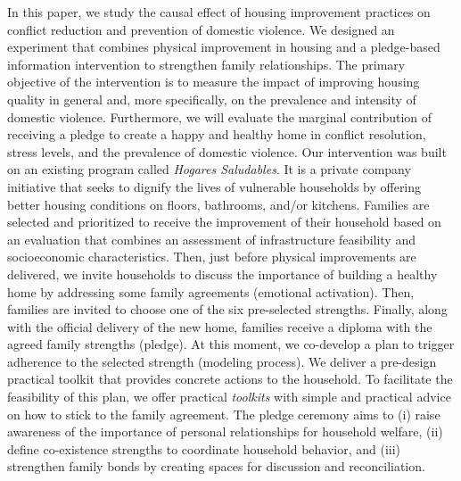         In this paper, we study the causal effect of housing improvement practices on conflict reduction and prevention of domestic violence. We designed an experiment that combines physical improvement in housing and a pledge-based information intervention to strengthen family relationships. The primary objective of the intervention is to measure the impact of improving housing quality in general and, more specifically, on the prevalence and intensity of domestic violence. Furthermore, we will evaluate the marginal contribution of receiving a pledge to create a happy and healthy home in conflict resolution, stress levels, and the prevalence of domestic violence. Our intervention was built on an existing program called \emph{Hogares Saludables}. It is a private company initiative that seeks to dignify the lives of vulnerable households by offering better housing conditions on floors, bathrooms, and/or kitchens. Families are selected and prioritized to receive the improvement of their household based on an evaluation that combines an assessment of infrastructure feasibility and socioeconomic characteristics. Then, just before physical improvements are delivered, we invite households to discuss the importance of building a healthy home by addressing some family agreements (emotional activation). Then, families are invited to choose one of the six pre-selected strengths. Finally, along with the official delivery of the new home, families receive a diploma with the agreed family strengths (pledge). At this moment, we co-develop a plan to trigger adherence to the selected strength (modeling process). We deliver a pre-design practical toolkit that provides concrete actions to the household. To facilitate the feasibility of this plan, we offer practical \emph{toolkits} with simple and practical advice on how to stick to the family agreement. The pledge ceremony aims to (i) raise awareness of the importance of personal relationships for household welfare, (ii) define co-existence strengths to coordinate household behavior, and (iii) strengthen family bonds by creating spaces for discussion and reconciliation. 


